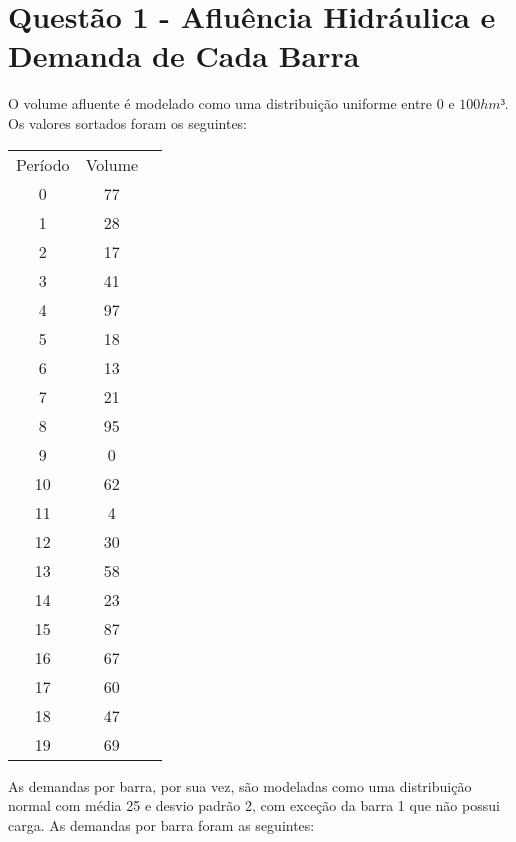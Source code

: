 \documentclass[a4paper,12pt,twoside]{article}
\begin{document}
\section{Questão 1 - Afluência Hidráulica e Demanda de Cada Barra}
O volume afluente é modelado como uma distribuição uniforme entre \(0\) e \(100hm³\).
Os valores sortados foram os seguintes:

\begin{center}
    \begin{tabular}{ c c c }
        Período & Volume \\
        0  & 77 \\
        1  & 28 \\
        2  & 17 \\
        3  & 41 \\
        4  & 97 \\
        5  & 18 \\
        6  & 13 \\
        7  & 21 \\
        8  & 95 \\
        9  & 0 \\
        10 & 62 \\
        11 & 4 \\
        12 & 30 \\
        13 & 58 \\
        14 & 23 \\
        15 & 87 \\
        16 & 67 \\
        17 & 60 \\
        18 & 47 \\
        19 & 69
    \end{tabular}
\end{center}
As demandas por barra, por sua vez, são modeladas como uma distribuição normal com média 25 e desvio padrão 2, com exceção da barra 1 que não possui carga.
As demandas por barra foram as seguintes:
\end{document}
